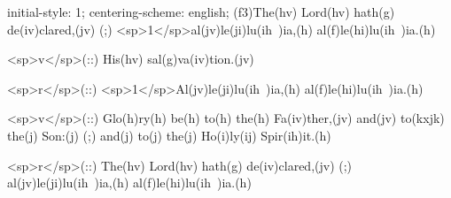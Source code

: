 initial-style: 1;
centering-scheme: english;
(f3)The(hv) Lord(hv) hath(g) de(iv)clared,(jv) (;) <sp>1</sp>al(jv)le(ji)lu(ih~)ia,(h) al(f)le(hi)lu(ih~)ia.(h)

<sp>v</sp>(::) His(hv) sal(g)va(iv)tion.(jv)

<sp>r</sp>(::) <sp>1</sp>Al(jv)le(ji)lu(ih~)ia,(h) al(f)le(hi)lu(ih~)ia.(h)

<sp>v</sp>(::) Glo(h)ry(h) be(h) to(h) the(h) Fa(iv)ther,(jv) and(jv) to(kxjk) the(j) Son:(j) (;) and(j) to(j) the(j) Ho(i)ly(ij) Spir(ih)it.(h)

<sp>r</sp>(::) The(hv) Lord(hv) hath(g) de(iv)clared,(jv) (;) al(jv)le(ji)lu(ih~)ia,(h) al(f)le(hi)lu(ih~)ia.(h)